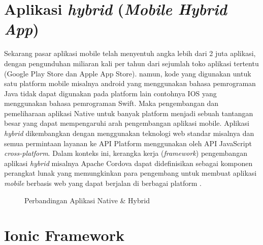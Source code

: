 \section{Aplikasi \textit{hybrid} (\textit{Mobile Hybrid App})}
\par Sekarang pasar aplikasi mobile telah menyentuh angka lebih dari 2 juta aplikasi, dengan pengunduhan miliaran kali per tahun dari sejumlah toko aplikasi tertentu (Google Play Store dan Apple App Store). namun, kode yang digunakan untuk satu platform mobile misalnya android yang menggunakan bahasa pemrograman Java tidak dapat digunakan pada platform lain contohnya IOS yang menggunakan bahasa pemrograman Swift. Maka pengembangan dan pemeliharaan aplikasi Native untuk banyak platform menjadi sebuah tantangan besar yang dapat mempengaruhi arah pengembangan aplikasi mobile. Aplikasi \textit{hybrid} dikembangkan dengan menggunakan teknologi web standar misalnya  dan semua permintaan layanan ke API Platform menggunakan oleh API JavaScript \textit{cross-platform}. Dalam konteks ini, kerangka kerja (\textit{framework}) pengembangan aplikasi \textit{hybrid} misalnya Apache Cordova dapat didefinisikan sebagai komponen perangkat lunak yang memungkinkan para pengembang untuk membuat aplikasi \textit{mobile} berbasis web yang dapat berjalan di berbagai platform \citep{malavolta2015hybrid}.
\begin{figure}[H]
	\centering
	\caption{Perbandingan Aplikasi Native \& Hybrid}
	\label{android}
\end{figure}

\section{Ionic Framework}

